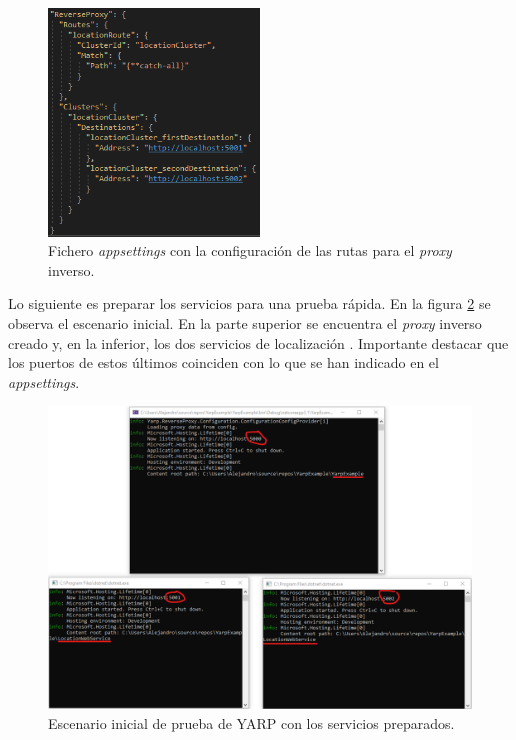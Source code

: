 \documentclass[11pt,spanish,listoffigures]{tfgetsinf}
\begin{document}
\begin{figure}[ht]
\centering
\includegraphics[width=0.50\textwidth]{imagenes/ejemploYARP/appsettings}
\caption{Fichero \emph{appsettings} con la configuración de las rutas para el \emph{proxy} inverso.}
	\label{ejemploYARP_appsettings}
\end{figure}

Lo siguiente es preparar los servicios para una prueba rápida. En la figura \ref{ejemploYARP_servicios_preparacion} se observa el escenario inicial. En la parte superior se encuentra el \emph{proxy} inverso creado y, en la inferior, los dos servicios de localización . Importante destacar que los puertos de estos últimos coinciden con lo que se han indicado en el \emph{appsettings}.

\begin{figure}[ht]
\centering
\includegraphics[width=1\textwidth]{imagenes/ejemploYARP/servicios_preparacion}
\caption{Escenario inicial de prueba de YARP con los servicios preparados.}
	\label{ejemploYARP_servicios_preparacion}
\end{figure}
\end{document}
